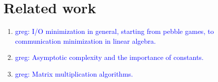 \documentclass[sigconf]{acmart}
\newcommand\greg[1]{\textcolor{blue}{greg: #1}}
\begin{document}
\section{Related work}
\begin{enumerate}
	\item \greg{I/O minimization in general, starting from pebble games, to 
	communication minimization in linear algebra.}
	\item \greg{Asymptotic complexity and the importance of constants.}
	\item \greg{Matrix multiplication algorithms.}
\end{enumerate}


%	
\end{document}
